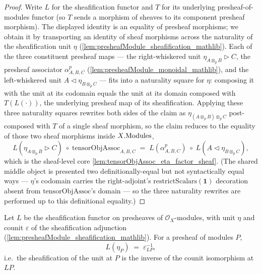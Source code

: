 \begin{proof}
  \leanok
  Write \(L\) for the sheafification functor and \(T\) for its underlying
  presheaf-of-modules functor (so \(T\) sends a morphism of sheaves to its component
  presheaf morphism). The displayed identity is an equality of presheaf morphisms; we
  obtain it by transporting an identity of sheaf morphisms across the naturality of
  the sheafification unit \(\eta\) (\cref{lem:presheafModule_sheafification_mathlib}).
  Each of the three constituent presheaf maps --- the right-whiskered unit
  \(\eta_{A \otimes_{p} B} \rhd C\), the presheaf associator \(\alpha^{p}_{A,B,C}\)
  (\cref{lem:presheafModule_monoidal_mathlib}), and the left-whiskered unit
  \(A \lhd \eta_{B \otimes_{p} C}\) --- fits into a naturality square for \(\eta\):
  composing it with the unit at its codomain equals the unit at its domain composed
  with \(T(L(\cdot))\), the underlying presheaf map of its sheafification. Applying
  these three naturality squares rewrites both sides of the claim as
  \(\eta_{(A \otimes_{p} B) \otimes_{p} C}\) post-composed with \(T\) of a single
  sheaf morphism, so the claim reduces to the equality of those two sheaf morphisms
  inside \(X.\mathrm{Modules}\),
  \[
    L(\eta_{A \otimes_{p} B} \rhd C) \;\circ\; \mathrm{tensorObjAssoc}_{A,B,C}
      \;=\; L(\alpha^{p}_{A,B,C}) \;\circ\; L(A \lhd \eta_{B \otimes_{p} C}),
  \]
  which is the sheaf-level core \cref{lem:tensorObjAssoc_eta_factor_sheaf}. (The
  shared middle object is presented two definitionally-equal but not syntactically
  equal ways --- \(\eta\)'s codomain carries the right-adjoint's
  \(\mathrm{restrictScalars}(\mathbf{1})\) decoration absent from
  \(\mathrm{tensorObjAssoc}\)'s domain --- so the three naturality rewrites are
  performed up to this definitional equality.)
\end{proof}

\begin{lemma}
  \label{lem:sheafification_map_unit_eq}
  Let \(L\) be the sheafification functor on presheaves of \(\mathcal{O}_X\)-modules,
  with unit \(\eta\) and counit \(\varepsilon\) of the sheafification adjunction
  (\cref{lem:presheafModule_sheafification_mathlib}). For a presheaf of modules
  \(P\),
  \[
    L(\eta_P) \;=\; \varepsilon_{L P}^{-1},
  \]
  i.e.\ the sheafification of the unit at \(P\) is the inverse of the counit
  isomorphism at \(LP\).
\end{lemma}

